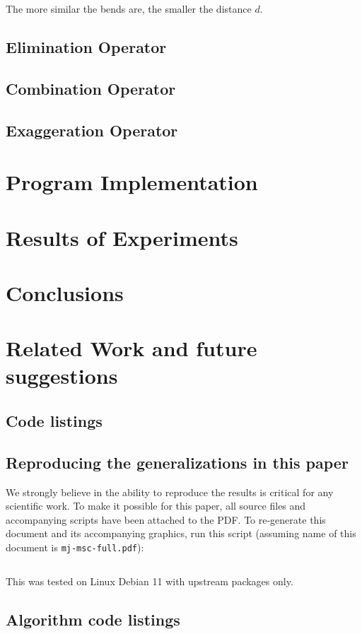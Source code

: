 \documentclass[a4paper]{article}
\newcommand{\inputcode}[2]{\inputminted[fontsize=\small]{#1}{#2}}
\newcommand{\inputcode}[2]{}
\begin{document}
The more similar the bends are, the smaller the distance $d$.

\subsection{Elimination Operator}

\subsection{Combination Operator}

\subsection{Exaggeration Operator}

\section{Program Implementation}

\section{Results of Experiments}

\section{Conclusions}
\label{sec:conclusions}

\section{Related Work and future suggestions}
\label{sec:related_work}

\printbibliography

\begin{appendices}

\section{Code listings}

\subsection{Reproducing the generalizations in this paper}

We strongly believe in the ability to reproduce the results is critical for any
    scientific work. To make it possible for this paper, all source files and
    accompanying scripts have been attached to the PDF. To re-generate this
    document and its accompanying graphics, run this script (assuming name of
    this document is {\tt mj-msc-full.pdf}):

\inputcode{bash}{extract-and-generate}

This was tested on Linux Debian 11 with upstream packages only.

\subsection{Algorithm code listings}

\end{appendices}
\end{document}
